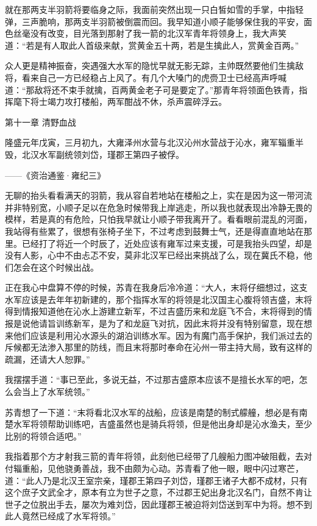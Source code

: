 就在那两支半羽箭将要临身之际，我面前突然出现一只白皙如雪的手掌，中指轻弹，三声脆响，那两支半羽箭被倒震而回。我早知道小顺子能够保住我的平安，面色丝毫没有改变，目光落到那射了我一箭的北汉军青年将领身上，我大声笑道：“若是有人取此人首级来献，赏黄金五十两，若是生擒此人，赏黄金百两。”

众人更是精神振奋，突遇强大水军的隐忧早就无影无踪，主帅既然要他们生擒敌将，看来自己一方已经稳占上风了。有几个大嗓门的虎赍卫士已经高声呼喊道：“那敌将还不束手就擒，百两黄金老子可是要定了。”那青年将领面色铁青，指挥麾下将士竭力攻打楼船，两军酣战不休，杀声震碎浮云。

第十一章    清野血战

隆盛元年戊寅，三月初九，大雍泽州水营与北汉沁州水营战于沁水，雍军辎重半毁，北汉水军副统领刘岱，瑾郡王第四子被俘。

——《资治通鉴·雍纪三》

无聊的抬头看看满天的羽箭，我从容自若地站在楼船之上，实在是因为这一带河流并非特别宽，小顺子足以在危急时候带我上岸逃走，所以我也就表现出冷静无畏的模样，若是真的有危险，只怕我早就让小顺子带我离开了。看看眼前混乱的河面，我站得有些累了，很想有张椅子坐下，不过考虑到鼓舞士气，还是得直直地站在那里。已经打了将近一个时辰了，近处应该有雍军过来支援，可是我抬头四望，却是没有人影，心中不由忐忑不安，莫非北汉军已经出来挑战了么，现在冀氏不稳，他们怎会在这个时候出战。

正在我心中盘算不停的时候，苏青在我身后冷冷道：“大人，末将仔细想过，这支水军应该是去年年初新建的，那个指挥水军的将领是北汉国主心腹将领吉盛，末将得到情报知道他在沁水上游建立新军，不过吉盛历来和龙庭飞不合，末将得到的情报是说他请旨训练新军，是为了和龙庭飞对抗，因此末将并没有特别留意，现在想来他们应该是利用沁水源头的湖泊训练水军。因为有魔门高手保护，我们派过去的斥候都无法渗入那里的防线，而且末将那时奉命在沁州一带主持大局，致有这样的疏漏，还请大人恕罪。”

我摆摆手道：“事已至此，多说无益，不过那吉盛原本应该不是擅长水军的吧，怎么会当上了水军统领。”

苏青想了一下道：“末将看北汉水军的战船，应该是南楚的制式艨艟，想必是有南楚水军将领帮助训练吧，吉盛虽然也是骑兵将领，但是他出身却是沁水渔夫，至少比别的将领合适吧。”

我指着那个方才射我三箭的青年将领，此刻他已经带了几艘船力图冲破阻截，去对付辎重船，见他骁勇善战，我不由颇为心动。苏青看了他一眼，眼中闪过寒芒，道：“此人乃是北汉王室宗亲，瑾郡王第四子刘岱，瑾郡王诸子大都不成材，只有这个庶子文武全才，原本有立为世子之意，不过郡王妃出身北汉名门，自然不肯让世子之位脱出手去，屡次为难刘岱，因此瑾郡王被迫将刘岱送到军中为将。想不到此人竟然已经成了水军将领。”


